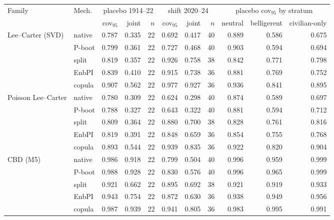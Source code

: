 \begin{threeparttable}\scriptsize\renewcommand{\arraystretch}{0.90}\setlength{\tabcolsep}{2.5pt}
\begin{tabular}{@{}llrrrrrrrrr@{}}
\toprule
Family & Mech. & \multicolumn{3}{c}{placebo 1914--22} & \multicolumn{3}{c}{shift 2020--24} & \multicolumn{3}{c}{placebo cov$_{95}$ by stratum} \\
 &  & cov$_{95}$ & joint & $n$ & cov$_{95}$ & joint & $n$ & neutral & belligerent & civilian-only \\
\midrule
Lee--Carter (SVD) & native & 0.787 & 0.335 & 22 & 0.692 & 0.417 & 40 & 0.889 & 0.586 & 0.675 \\
 & P-boot & 0.799 & 0.361 & 22 & 0.727 & 0.468 & 40 & 0.903 & 0.594 & 0.694 \\
 & split & 0.819 & 0.357 & 22 & 0.926 & 0.758 & 38 & 0.842 & 0.771 & 0.798 \\
 & EnbPI & 0.839 & 0.410 & 22 & 0.915 & 0.738 & 36 & 0.881 & 0.769 & 0.752 \\
 & copula & 0.907 & 0.562 & 22 & 0.977 & 0.927 & 36 & 0.936 & 0.841 & 0.895 \\
\addlinespace[1pt]
Poisson Lee--Carter & native & 0.780 & 0.309 & 22 & 0.624 & 0.298 & 40 & 0.874 & 0.589 & 0.697 \\
 & P-boot & 0.788 & 0.327 & 22 & 0.643 & 0.322 & 40 & 0.881 & 0.594 & 0.712 \\
 & split & 0.809 & 0.364 & 22 & 0.880 & 0.700 & 38 & 0.828 & 0.761 & 0.816 \\
 & EnbPI & 0.819 & 0.391 & 22 & 0.848 & 0.659 & 36 & 0.854 & 0.755 & 0.768 \\
 & copula & 0.893 & 0.544 & 22 & 0.939 & 0.835 & 36 & 0.922 & 0.820 & 0.904 \\
\addlinespace[1pt]
CBD (M5) & native & 0.986 & 0.918 & 22 & 0.799 & 0.504 & 40 & 0.996 & 0.959 & 0.999 \\
 & P-boot & 0.988 & 0.928 & 22 & 0.830 & 0.576 & 40 & 0.996 & 0.965 & 0.999 \\
 & split & 0.921 & 0.662 & 22 & 0.895 & 0.692 & 38 & 0.921 & 0.919 & 0.933 \\
 & EnbPI & 0.943 & 0.754 & 22 & 0.872 & 0.630 & 36 & 0.938 & 0.949 & 0.956 \\
 & copula & 0.987 & 0.939 & 22 & 0.941 & 0.805 & 36 & 0.983 & 0.995 & 0.991 \\

\end{tabular}
\end{threeparttable}
